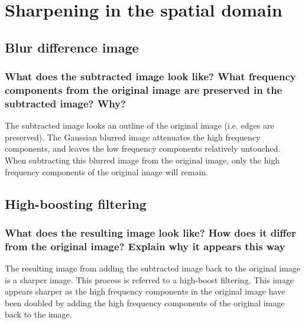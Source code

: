 \section{Sharpening in the spatial domain}

\subsection{Blur difference image}
\begin{figure}[ht]
\centering
\end{figure}



\subsubsection{What does the subtracted image look like? What frequency components from the original image are preserved in the subtracted image? Why?}
The subtracted image looks an outline of the original image (i.e. edges are preserved). The Gaussian blurred image attenuates the high frequency components, and leaves the low frequency components relatively untouched. When subtracting this blurred image from the original image, only the high frequency components of the original image will remain.

\clearpage
\subsection{High-boosting filtering}
\begin{figure}[ht]
\centering
\end{figure}

\subsubsection{What does the resulting image look like? How does it differ from the original image? Explain why it appears this way}
The resulting image from adding the subtracted image back to the original image is a sharper image. This process is referred to a high-boost filtering. This image appears sharper as the high frequency components in the original image have been doubled by adding the high frequency components of the original image back to the image.

